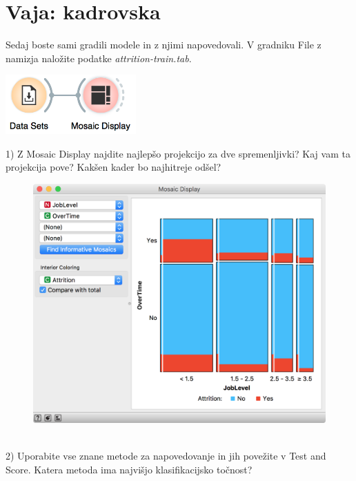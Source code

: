 \chapter{Vaja: kadrovska}
\label{hw:klasifikacija}

Sedaj boste sami gradili modele in z njimi napovedovali. V gradniku File z namizja naložite podatke \textit{attrition-train.tab}.

\begin{marginfigure}
    \centering
    \includegraphics[width=50mm]{workflow1.png}
    \caption{$\;$}
    \label{fig:workflow1}
\end{marginfigure}

\hspace{1cm}

1) Z Mosaic Display najdite najlepšo projekcijo za dve spremenljivki? Kaj vam ta projekcija pove? Kakšen kader bo najhitreje odšel?

\begin{figure}
    \includegraphics[scale=0.45]{mosaic.png}
    \caption{$\;$}
\end{figure}

2) Uporabite vse znane metode za napovedovanje in jih povežite v Test and Score. Katera metoda ima najvišjo klasifikacijsko točnost?

